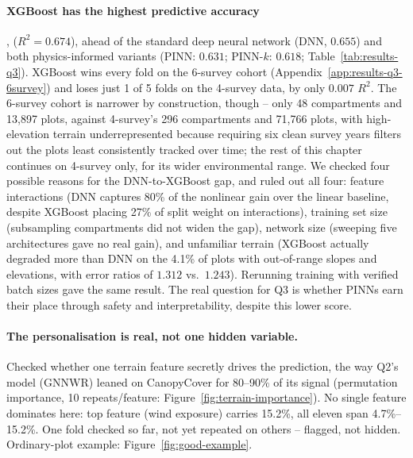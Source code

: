 \paragraph*{XGBoost has the highest predictive accuracy}, ($R^2 = 0.674$), ahead of the standard
deep neural network (DNN, $0.655$) and both physics-informed variants (PINN: $0.631$; PINN-$k$:
$0.618$; Table~\ref{tab:results-q3}). XGBoost wins every fold on the 6-survey cohort
(Appendix~\ref{app:results-q3-6survey}) and loses just 1 of 5 folds on the 4-survey data, by
only $0.007$ $R^2$. The 6-survey cohort is narrower by construction, though -- only 48
compartments and 13,897 plots, against 4-survey's 296 compartments and 71,766 plots, with
high-elevation terrain underrepresented because requiring six clean survey years filters out
the plots least consistently tracked over time; the rest of this chapter continues on 4-survey
only, for its wider environmental range. We checked four possible reasons for the DNN-to-XGBoost
gap, and ruled out all four: feature interactions (DNN captures 80\% of the nonlinear gain over
the linear baseline, despite XGBoost placing 27\% of split weight on interactions), training
set size (subsampling compartments did not widen the gap), network size (sweeping five
architectures gave no real gain), and unfamiliar terrain (XGBoost actually degraded more than
DNN on the 4.1\% of plots with out-of-range slopes and elevations, with error ratios of $1.312$
vs.\ $1.243$). Rerunning training with verified batch sizes gave the same result. The real
question for Q3 is whether PINNs earn their place through safety and interpretability, despite
this lower score.



\paragraph*{The personalisation is real, not one hidden variable.}
Checked whether one terrain feature secretly drives the prediction, the way Q2's model (GNNWR)
leaned on CanopyCover for 80--90\% of its signal (permutation importance, 10 repeats/feature:
Figure~\ref{fig:terrain-importance}). No single feature dominates here: top feature (wind
exposure) carries 15.2\%, all eleven span 4.7\%--15.2\%. One fold checked so far, not yet
repeated on others -- flagged, not hidden. Ordinary-plot example: Figure~\ref{fig:good-example}.

